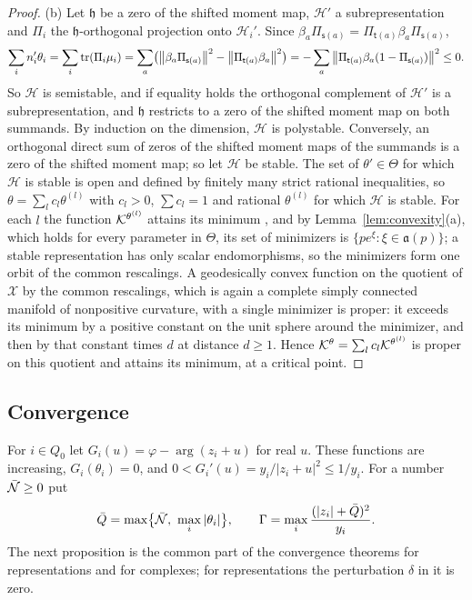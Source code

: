\begin{proof}
(b) Let $\mathfrak h$ be a zero of the shifted moment map, $\mathcal H'$ a
subrepresentation and $\Pi_i$ the $\mathfrak h$-orthogonal projection onto
$\mathcal H_i'$. Since
$\beta_a\Pi_{\mathsf s(a)}=\Pi_{\mathsf t(a)}\beta_a\Pi_{\mathsf s(a)}$,
\[
 \sum_in_i'\theta_i=\sum_i\operatorname{tr}(\Pi_i\mu_i)
 =\sum_a\bigl(\left\lVert\beta_a\Pi_{\mathsf s(a)}\right\rVert^2-\left\lVert\Pi_{\mathsf t(a)}\beta_a\right\rVert^2\bigr)
 =-\sum_a\left\lVert\Pi_{\mathsf t(a)}\beta_a(1-\Pi_{\mathsf s(a)})\right\rVert^2\leq0 .
\]
So $\mathcal H$ is semistable, and if equality holds the orthogonal
complement of $\mathcal H'$ is a subrepresentation, and $\mathfrak h$
restricts to a zero of the shifted moment map on both summands. By induction on the
dimension, $\mathcal H$ is polystable. Conversely, an orthogonal direct sum
of zeros of the shifted moment maps of the summands is a zero of the shifted moment map; so
let $\mathcal H$ be stable. The set of $\theta'\in\Theta$ for which
$\mathcal H$ is stable is open and defined by finitely many strict rational
inequalities, so $\theta=\sum_lc_l\theta^{(l)}$ with $c_l>0$, $\sum c_l=1$ and
rational $\theta^{(l)}$ for which $\mathcal H$ is stable. For each $l$ the
function $\mathcal K^{\theta^{(l)}}$ attains its minimum
\cite[Proposition~6.5]{kin94}, and by Lemma~\ref{lem:convexity}(a), which
holds for every parameter in $\Theta$, its set of minimizers is
$\{pe^\xi:\xi\in\mathfrak a(p)\}$; a stable representation has only scalar
endomorphisms, so the minimizers form one orbit of the common rescalings. A
geodesically convex function on the quotient of $\mathcal X$ by the common
rescalings, which is again a complete simply connected manifold of
nonpositive curvature, with a single minimizer is proper: it exceeds its
minimum by a positive constant on the unit sphere around the minimizer, and
then by that constant times $d$ at distance $d\geq1$. Hence
$\mathcal K^\theta=\sum_lc_l\mathcal K^{\theta^{(l)}}$ is proper on this quotient and attains
its minimum, at a critical point.
\end{proof}

\subsection{Convergence}
For $i\in Q_0$ let $G_i(u)=\varphi-\arg(z_i+u)$ for real $u$. These functions
are increasing, $G_i(\theta_i)=0$, and
$0<G_i'(u)=y_i/|z_i+u|^2\leq1/y_i$. For a number $\bar{\mathcal N}\geq0$ put
\begin{equation}\label{eq:Gamma}
 \bar Q=\max\bigl\{\bar{\mathcal N},\ \max_i|\theta_i|\bigr\},\qquad
 \Gamma=\max_i\frac{(|z_i|+\bar Q)^2}{y_i}.
\end{equation}
The next proposition is the common part of the convergence theorems for
representations and for complexes; for representations the perturbation
$\delta$ in it is zero.

